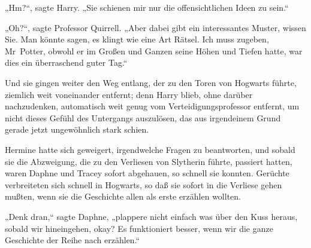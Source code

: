 „Hm?“, sagte Harry. „Sie schienen mir nur die offensichtlichen Ideen zu sein.“

„Oh?“, sagte Professor Quirrell. „Aber dabei gibt ein interessantes Muster, wissen Sie. Man könnte sagen, es klingt wie eine Art Rätsel. Ich muss zugeben, Mr~Potter, obwohl er im Großen und Ganzen seine Höhen und Tiefen hatte, war dies ein überraschend guter Tag.“

Und sie gingen weiter den Weg entlang, der zu den Toren von Hogwarts führte, ziemlich weit voneinander entfernt; denn Harry blieb, ohne darüber nachzudenken, automatisch weit genug vom Verteidigungsprofessor entfernt, um nicht dieses Gefühl des Untergangs auszulösen, das aus irgendeinem Grund gerade jetzt ungewöhnlich stark schien.


Hermine hatte sich geweigert, irgendwelche Fragen zu beantworten, und sobald sie die Abzweigung, die zu den Verliesen von Slytherin führte, passiert hatten, waren Daphne und Tracey sofort abgehauen, so schnell sie konnten. Gerüchte verbreiteten sich schnell in Hogwarts, so daß sie sofort in die Verliese gehen mußten, wenn sie die Geschichte allen als erste erzählen wollten.

„Denk dran,“ sagte Daphne, „plappere nicht einfach was über den Kuss heraus, sobald wir hineingehen, okay? Es funktioniert besser, wenn wir die ganze Geschichte der Reihe nach erzählen.“

